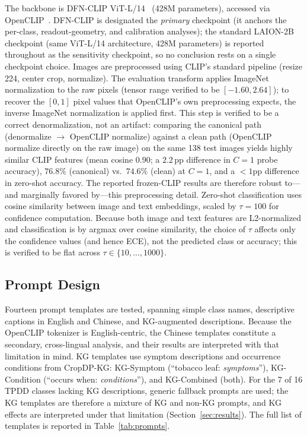 \documentclass[10pt,a4paper]{article}
\begin{document}
The backbone is DFN-CLIP ViT-L/14~\cite{fang2023data} (428M parameters), accessed via OpenCLIP~\cite{cherti2023reproducible,ilharco2022openclip}.
DFN-CLIP is designated the \emph{primary} checkpoint (it anchors the per-class, readout-geometry, and calibration analyses); the standard LAION-2B checkpoint (same ViT-L/14 architecture, 428M parameters) is reported throughout as the sensitivity checkpoint, so no conclusion rests on a single checkpoint choice.
Images are preprocessed using CLIP's standard pipeline (resize 224, center crop, normalize). The evaluation transform applies ImageNet normalization to the raw pixels (tensor range verified to be $[-1.60,2.64]$); to recover the $[0,1]$ pixel values that OpenCLIP's own preprocessing expects, the inverse ImageNet normalization is applied first. This step is verified to be a correct denormalization, not an artifact: comparing the canonical path (denormalize $\to$ OpenCLIP normalize) against a clean path (OpenCLIP normalize directly on the raw image) on the same 138 test images yields highly similar CLIP features (mean cosine $0.90$; a $2.2$\,pp difference in $C{=}1$ probe accuracy), $76.8\%$ (canonical) vs.\ $74.6\%$ (clean) at $C{=}1$, and a $<1$pp difference in zero-shot accuracy. The reported frozen-CLIP results are therefore robust to---and marginally favored by---this preprocessing detail.
Zero-shot classification uses cosine similarity between image and text embeddings, scaled by $\tau=100$ for confidence computation.
Because both image and text features are L2-normalized and classification is by argmax over cosine similarity, the choice of $\tau$ affects only the confidence values (and hence ECE), not the predicted class or accuracy; this is verified to be flat across $\tau\in\{10,\dots,1000\}$.

\subsection{Prompt Design}

Fourteen prompt templates are tested, spanning simple class names, descriptive captions in English and Chinese, and KG-augmented descriptions. Because the OpenCLIP tokenizer is English-centric, the Chinese templates constitute a secondary, cross-lingual analysis, and their results are interpreted with that limitation in mind.
KG templates use symptom descriptions and occurrence conditions from CropDP-KG: KG-Symptom (``tobacco leaf: \textit{symptoms}''), KG-Condition (``occurs when: \textit{conditions}''), and KG-Combined (both).
For the 7 of 16 TPDD classes lacking KG descriptions, generic fallback prompts are used; the KG templates are therefore a mixture of KG and non-KG prompts, and KG effects are interpreted under that limitation (Section~\ref{sec:results}).
The full list of templates is reported in Table~\ref{tab:prompts}.
\end{document}

